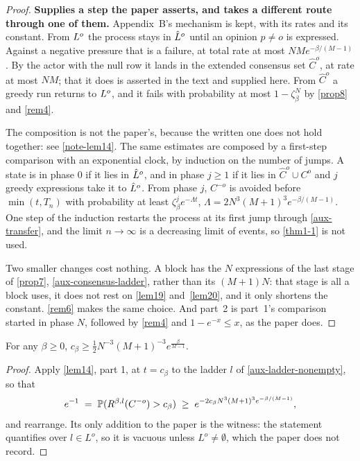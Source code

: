 \begin{proof}
  \leanok
  \textbf{Supplies a step the paper asserts, and takes a different route
  through one of them.}  Appendix~B's mechanism is kept, with its rates and its
  constant.  From $L^o$ the process stays in $\hat{L}^o$ until an opinion
  $p \ne o$ is expressed.  Against a negative pressure that is a failure, at
  total rate at most $NMe^{-\beta/(M-1)}$.  By the actor with the null row it
  lands in the extended consensus set $\hat{C}^o$, at rate at most $NM$; that it
  does is asserted in the text and supplied here.  From $\hat{C}^o$ a greedy run
  returns to $L^o$, and it fails with probability at most
  $1 - \zeta_\beta^{N}$ by \ref{prop8} and \ref{rem4}.

  The composition is not the paper's, because the written one does not hold
  together: see \ref{note-lem14}.  The same estimates are composed by a
  first-step comparison with an exponential clock, by induction on the number of
  jumps.  A state is in phase $0$ if it lies in $\hat{L}^o$, and in phase $j \ge
  1$ if it lies in $\hat{C}^o \cup C^o$ and $j$ greedy expressions take it to
  $\hat{L}^o$.  From phase $j$, $C^{-o}$ is avoided before $\min(t, T_n)$ with
  probability at least $\zeta_\beta^j e^{-\Lambda t}$, $\Lambda =
  2N^3(M+1)^3e^{-\beta/(M-1)}$.  One step of the induction restarts the process
  at its first jump through \ref{aux-transfer}, and the limit $n \to \infty$ is
  a decreasing limit of events, so \ref{thm1-1} is not used.

  Two smaller changes cost nothing.  A block has the $N$ expressions of the
  last stage of \ref{prop7}, \ref{aux-consensus-ladder}, rather than its
  $(M+1)N$: that stage is all a block uses, it does not rest on \ref{lem19}
  and~\ref{lem20}, and it only shortens the constant.  \ref{rem6} makes the same
  choice.  And part~2 is part~1's comparison started in phase $N$, followed by
  \ref{rem4} and $1 - e^{-x} \le x$, as the paper does.
\end{proof}

\begin{corollary}
  \label{cor15}
  \leanok
  For any $\beta \ge 0$,
  $c_\beta \ge \tfrac{1}{2} N^{-3}(M+1)^{-3} e^{\frac{\beta}{M-1}}$.
\end{corollary}
\begin{proof}
  \leanok
  Apply \ref{lem14}, part 1, at $t = c_\beta$ to the ladder $l$ of
  \ref{aux-ladder-nonempty}, so that
  \[
    e^{-1} \;=\; \mathbb{P}(R^{\beta,l}(C^{-o}) > c_\beta)
    \;\ge\; e^{-2c_\beta N^3(M+1)^3 e^{-\beta/(M-1)}} ,
  \]
  and rearrange.  Its only addition to the paper is the witness: the statement
  quantifies over $l \in L^o$, so it is vacuous unless $L^o \ne \emptyset$,
  which the paper does not record.
\end{proof}

